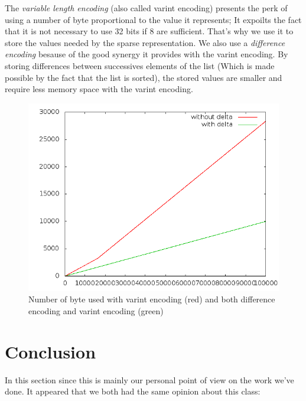 \documentclass{article}
\begin{document}
The \emph{variable length encoding} (also called varint encoding)
presents the perk of using a number of byte proportional to the value
it represents; It expoilts the fact that it is not necessary to use 32
bits if 8 are sufficient. That's why we use it to store the values
needed by the sparse representation.  We also use a \emph{difference
  encoding} besause of the good synergy it provides with the varint
encoding.  By storing differences between successives elements of the
list (Which is made possible by the fact that the list is sorted), the
stored values are smaller and require less memory space with the
varint encoding.

\begin{center}
\begin{figure}[!htb]
\includegraphics[scale=0.5]{img03.png}
\caption{Number of byte used with varint encoding (red) and both
  difference encoding and varint encoding (green)}
\end{figure}
\end{center}
\clearpage

\section{Conclusion}

In this section since this is mainly our personal point of view on the
work we've done. It appeared that we both had the same opinion about
this class:
\end{document}
